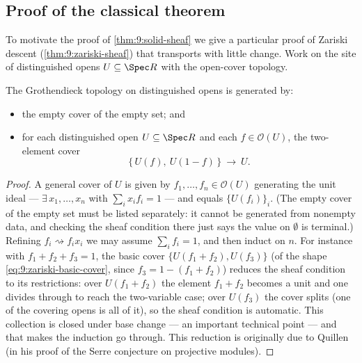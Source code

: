 \subsection{Proof of the classical theorem}

To motivate the proof of \cref{thm:9:solid-sheaf} we give a particular proof of
Zariski descent (\cref{thm:9:zariski-sheaf}) that transports with little change.
Work on the site of distinguished opens $U\subseteq\Spec R$ with the open-cover
topology.

\begin{lemma}
\label{lem:9:zariski-covers}
The Grothendieck topology on distinguished opens is generated by:
\begin{itemize}
\item the empty cover of the empty set; and
\item for each distinguished open $U\subseteq\Spec R$ and each $f\in\mathcal
O(U)$, the two-element cover
\begin{equation}
\label{eq:9:zariski-basic-cover}
\bigl\{\,U(f),\ U(1-f)\,\bigr\}\ \longrightarrow\ U.
\end{equation}
\end{itemize}
\end{lemma}

\begin{proof}
A general cover of $U$ is given by $f_{1},\dots,f_{n}\in\mathcal O(U)$
generating the unit ideal --- $\exists\,x_{1},\dots,x_{n}$ with $\sum_{i}x_{i}
f_{i}=1$ --- and equals $\{U(f_{i})\}_{i}$. (The empty cover of the empty set
must be listed separately: it cannot be generated from nonempty data, and
checking the sheaf condition there just says the value on $\emptyset$ is
terminal.) Refining $f_{i}\rightsquigarrow f_{i}x_{i}$ we may assume
$\sum_{i}f_{i}=1$, and then induct on $n$. For instance with $f_{1}+f_{2}+f_{3}=
1$, the basic cover $\{U(f_{1}+f_{2}),U(f_{3})\}$ (of the shape
\eqref{eq:9:zariski-basic-cover}, since $f_{3}=1-(f_{1}+f_{2})$) reduces the
sheaf condition to its restrictions: over $U(f_{1}+f_{2})$ the element
$f_{1}+f_{2}$ becomes a unit and one divides through to reach the two-variable
case; over $U(f_{3})$ the cover splits (one of the covering opens is all of it),
so the sheaf condition is automatic. This collection is closed under base
change --- an important technical point --- and that makes the induction go
through. This reduction is originally due to Quillen (in his proof of the
Serre conjecture on projective modules).
\end{proof}

